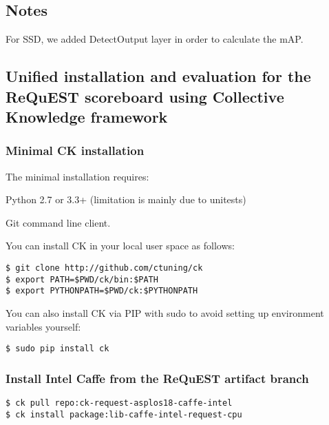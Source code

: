 \documentclass[sigplan]{acmart}
\newenvironment{packed_itemize}{
\begin{itemize}
  \setlength{\itemsep}{1pt}
  \setlength{\parskip}{0pt}
  \setlength{\parsep}{0pt}
}{\end{itemize}}
\begin{document}
\subsection{Notes}
For SSD, we added DetectOutput layer in order to calculate the mAP.



\subsection{Unified installation and evaluation for the ReQuEST scoreboard using Collective Knowledge framework}

\subsubsection{Minimal CK installation}

The minimal installation requires:

\begin{packed_itemize}
 \item Python 2.7 or 3.3+ (limitation is mainly due to unitests)
 \item Git command line client.
\end{packed_itemize}

You can install CK in your local user space as follows:

\begin{verbatim}
$ git clone http://github.com/ctuning/ck
$ export PATH=$PWD/ck/bin:$PATH
$ export PYTHONPATH=$PWD/ck:$PYTHONPATH
\end{verbatim}

You can also install CK via PIP with sudo to avoid setting up environment variables yourself:

\begin{verbatim}
$ sudo pip install ck
\end{verbatim}

\subsubsection{Install Intel Caffe from the ReQuEST artifact branch}

\begin{verbatim}
$ ck pull repo:ck-request-asplos18-caffe-intel
$ ck install package:lib-caffe-intel-request-cpu
\end{verbatim}
\end{document}
